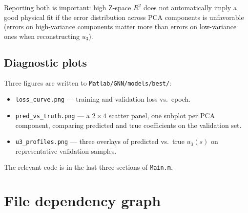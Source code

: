 \documentclass[11pt]{article}
\begin{document}
Reporting both is important: high Z-space $R^2$ does not automatically imply
a good physical fit if the error distribution across PCA components is
unfavorable (errors on high-variance components matter more than errors on
low-variance ones when reconstructing $u_3$).

\subsection{Diagnostic plots}

Three figures are written to \texttt{Matlab/GNN/models/best/}:

\begin{itemize}
  \item \texttt{loss\_curve.png} --- training and validation loss vs.\ epoch.
  \item \texttt{pred\_vs\_truth.png} --- a $2\times 4$ scatter panel, one
        subplot per PCA component, comparing predicted and true coefficients
        on the validation set.
  \item \texttt{u3\_profiles.png} --- three overlays of predicted vs.\ true
        $u_3(s)$ on representative validation samples.
\end{itemize}

The relevant code is in the last three sections of \texttt{Main.m}.

\section{File dependency graph}
\end{document}
